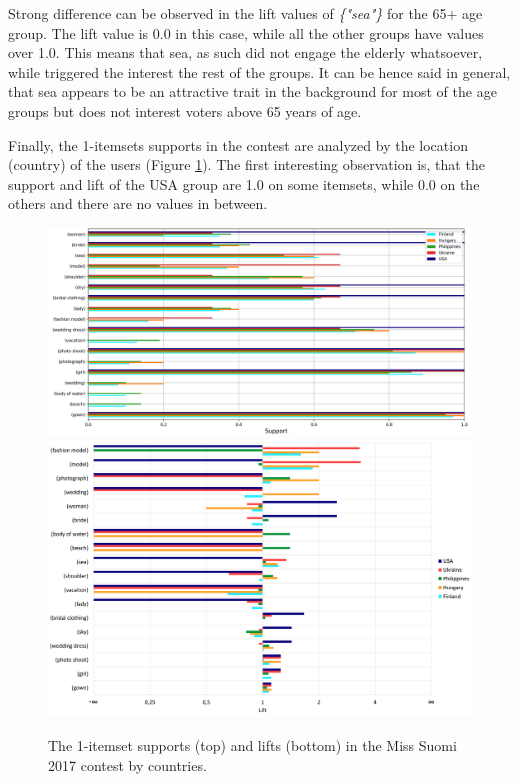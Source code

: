 Strong difference can be observed in the lift values of \emph{\{"sea"\}} for the 65+ age group. The lift value is 0.0 in this case, while all the other groups have values over 1.0. This means that sea, as such did not engage the elderly whatsoever, while triggered the interest the rest of the groups. It can be hence said in general, that sea appears to be an attractive trait in the background for most of the age groups but does not interest voters above 65 years of age. 


Finally, the 1-itemsets supports in the contest are analyzed by the location (country) of the users (Figure \ref{itemset_supports-country-Miss_Helsinki-1_itemset}). The first interesting observation is, that the support and lift of the USA group are 1.0 on some itemsets, while 0.0 on the others and there are no values in between. 

\begin{figure}[] 
    \begin{center}
        \includegraphics[width=1.2\textwidth,center]{Images/itemset_supports-country-Miss_Helsinki-1_itemset.png}
        \includegraphics[width=1.2\textwidth,center]{Images/itemset_lifts-country-Miss_Suomi-1_itemsets.png}
        \caption{The 1-itemset supports (top) and lifts (bottom) in the Miss Suomi 2017 contest by countries.}
        \label{itemset_supports-country-Miss_Helsinki-1_itemset}
    \end{center}
\end{figure}

